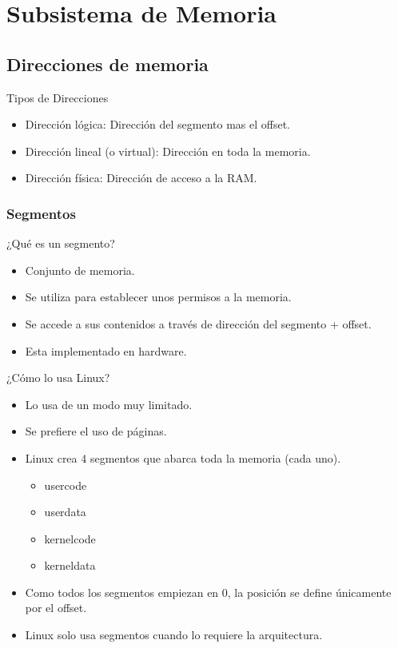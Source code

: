 \section{Subsistema de Memoria}
\subsection{Direcciones de memoria}
\begin{frame}{Tipos de Direcciones}
	\begin{itemize}
		\item Dirección lógica: Dirección del segmento mas el offset.
		\item Dirección lineal (o virtual): Dirección en toda la memoria.
		\item Dirección física: Dirección de acceso a la RAM.
	\end{itemize}
\end{frame}

\subsubsection{Segmentos}
\begin{frame}{¿Qué es un segmento?}
	\begin{itemize}
		\item Conjunto de memoria.
		\item Se utiliza para establecer unos permisos a la memoria.
		\item Se accede a sus contenidos a través de dirección del segmento + offset.
		\item Esta implementado en hardware.
	\end{itemize}
\end{frame}

\begin{frame}{¿Cómo lo usa Linux?}
	\begin{itemize}
		\item Lo usa de un modo muy limitado.
		\item Se prefiere el uso de páginas.
		\item Linux crea 4 segmentos que abarca toda la memoria (cada uno).
		\begin{itemize}
			\item usercode
			\item userdata
			\item kernelcode
			\item kerneldata
		\end{itemize}
		\item Como todos los segmentos empiezan en 0, la posición se define únicamente por el offset.
		\item Linux solo usa segmentos cuando lo requiere la arquitectura.
	\end{itemize}
\end{frame}

